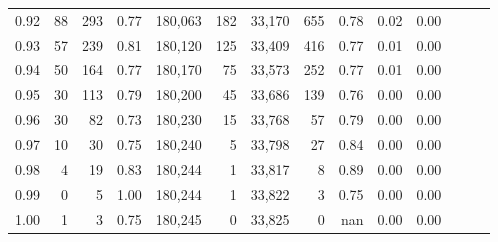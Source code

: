 \begin{tabular}{rrrrrrrrrrrrrr}
0.92 &     88 &  293 &  0.77 &  180,063 &      182 &  33,170 &     655 &  0.78 &  0.02 &      0.00 \\
0.93 &     57 &  239 &  0.81 &  180,120 &      125 &  33,409 &     416 &  0.77 &  0.01 &      0.00 \\
0.94 &     50 &  164 &  0.77 &  180,170 &       75 &  33,573 &     252 &  0.77 &  0.01 &      0.00 \\
0.95 &     30 &  113 &  0.79 &  180,200 &       45 &  33,686 &     139 &  0.76 &  0.00 &      0.00 \\
0.96 &     30 &   82 &  0.73 &  180,230 &       15 &  33,768 &      57 &  0.79 &  0.00 &      0.00 \\
0.97 &     10 &   30 &  0.75 &  180,240 &        5 &  33,798 &      27 &  0.84 &  0.00 &      0.00 \\
0.98 &      4 &   19 &  0.83 &  180,244 &        1 &  33,817 &       8 &  0.89 &  0.00 &      0.00 \\
0.99 &      0 &    5 &  1.00 &  180,244 &        1 &  33,822 &       3 &  0.75 &  0.00 &      0.00 \\
1.00 &      1 &    3 &  0.75 &  180,245 &        0 &  33,825 &       0 &   nan &  0.00 &      0.00 \\
\bottomrule
\end{tabular}
